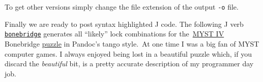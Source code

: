 \noindent To get other versions simply change the file extension of the output
\texttt{-o} file.


Finally we are ready to post syntax highlighted J code. The following J
verb \href{https://www.box.com/s/zgnyhgsamlxbqvkw7r4t}{\texttt{bonebridge}} generates 
all ``likely'' lock combinations for
the~\href{http://en.wikipedia.org/wiki/Myst\_IV:\_Revelation}{MYST IV}
Bonebridge
\href{http://www.fisicx.com/revelation/walkthrough.htm}{puzzle} in
Pandoc's tango style.~At one time I was a big fan of MYST computer
games. I always enjoyed being lost in a beautiful puzzle which, if you
discard the \emph{beautiful} bit, is a pretty accurate description of my
programmer day job.

